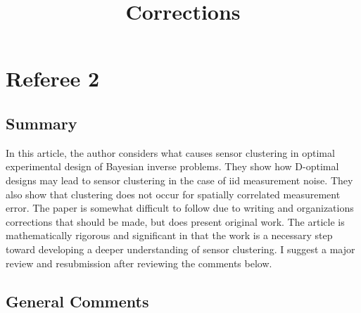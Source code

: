 \documentclass{amsart}
\title{Corrections}
\begin{document}
\maketitle

\section{Referee 2}
\subsection{Summary}
In this article, the author considers what causes sensor clustering in
optimal experimental design of Bayesian inverse problems. They show
how D-optimal designs may lead to sensor clustering in the case of iid
measurement noise. They also show that clustering does not occur for
spatially correlated measurement error. The paper is somewhat
difficult to follow due to writing and organizations corrections that
should be made, but does present original work. The article is
mathematically rigorous and significant in that the work is a
necessary step toward developing a deeper understanding of sensor
clustering. I suggest a major review and resubmission after reviewing
the comments below.


\subsection{General Comments}
\end{document}
